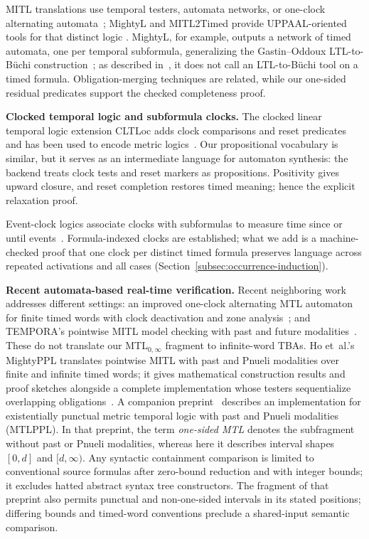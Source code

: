 \documentclass[manuscript]{acmart}
\newcommand{\runinhead}[1]{\par\noindent\textbf{#1}\enspace}
\begin{document}
MITL translations use temporal testers, automata networks, or one-clock
alternating automata~\cite{maler_mitl_to_ta,
ferrere2019_realtimelogic_to_ta,BM14}; MightyL and MITL2Timed provide
UPPAAL-oriented tools for that distinct logic
\cite{mightyl_paper17,mitl2timed_github}. MightyL, for example, outputs a
network of timed automata, one per temporal subformula, generalizing the
Gastin--Oddoux LTL-to-B\"uchi construction~\cite{ltl2ba_cav01}; as described in~\cite{mightyl_paper17}, it does not call an LTL-to-B\"uchi
tool on a timed formula. Obligation-merging techniques are
related, while our one-sided residual predicates support the checked
completeness proof.

\runinhead{Clocked temporal logic and subformula clocks.}
The clocked linear temporal logic extension CLTLoc adds clock comparisons and reset predicates and has been used to
encode metric logics~\cite{bersani_cltloc}. Our propositional vocabulary
is similar, but it serves as an intermediate language for automaton synthesis: the backend treats clock
tests and reset markers as propositions. Positivity gives upward closure, and
reset completion restores timed meaning; hence the explicit relaxation proof.

Event-clock logics associate clocks with subformulas to measure time since or
until events~\cite{afh_eventclock_tcs99,
raskin_schobbens_jalc99,nickovic_piterman_formats10}. Formula-indexed clocks
are established; what we add is a machine-checked proof that one clock per
distinct timed formula preserves language across repeated activations and all
cases (Section~\ref{subsec:occurrence-induction}).

\runinhead{Recent automata-based real-time verification.}
Recent neighboring work addresses different settings: an improved one-clock
alternating MTL automaton for finite timed words with clock deactivation and
zone analysis~\cite{bouyer_srivathsan_vishwanath_fossacs25}; and TEMPORA's
pointwise MITL model checking with past and future modalities~\cite{akshay_et_al_tempora26}. These do not
translate our MTL$_{0,\infty}$ fragment to infinite-word TBAs.
Ho et~al.'s MightyPPL translates pointwise MITL with past and Pnueli
modalities over finite and infinite timed words; it gives mathematical
construction results and proof sketches alongside a complete implementation
whose testers sequentialize overlapping obligations~\cite{mightyppl_tacas26}. A companion
preprint~\cite{mightyppl_qest_arxiv26} describes
an implementation for existentially punctual metric temporal logic with past
and Pnueli modalities (MTLPPL). In that preprint, the term
\emph{one-sided MTL} denotes the subfragment without past or Pnueli modalities, whereas
here it describes interval shapes $[0,d]$ and $[d,\infty)$. Any syntactic
containment comparison is limited to conventional source formulas after
zero-bound reduction and with integer bounds; it excludes hatted abstract syntax tree
constructors. The fragment of that preprint also permits punctual and non-one-sided
intervals in its stated positions; differing bounds and timed-word
conventions preclude a shared-input semantic comparison.
\end{document}
